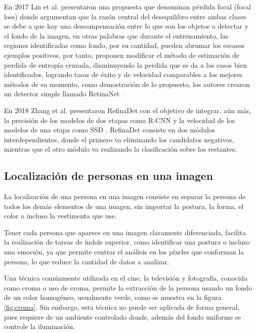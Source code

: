            En 2017 Lin et al. presentaron una propuesta que denominan pérdida focal (focal loss) \cite{Lin2017} donde argumentan que la razón central del desequilibro entre ambas clases se debe a que hay una descompensación entre lo que son los objetos a detectar y el fondo de la imagen, en otras palabras que durante el entrenamiento, las regiones identificadas como fondo, por su cantidad, pueden abrumar los escasos ejemplos positivos, por tanto, proponen modificar el método de estimación de perdida de entropía cruzada, disminuyendo la perdida que se da a los casos bien identificados, logrando tasas de éxito y de velocidad comparables a los mejores métodos de su momento, como demostración de lo propuesto, los autores crearon un detector simple llamado RetinaNet \cite{Lin2017}.
            
            En 2018 Zhang et al. presentaron RefinaDet \cite{Zhang2018} con el objetivo de  integrar, aún más, la precisión de los modelos de dos etapas como R-CNN \cite{Girshick2014} y la velocidad de los modelos de una etapa como SSD \cite{Liu2016}. RefinaDet consiste en dos módulos interdependientes, donde el primero va eliminando los candidatos negativos, mientras que el otro módulo va realizando la clasificación sobre los restantes.

    \subsection{Localización de personas en una imagen}
    \label{sub:FramePersonDetection}
        La localización de una persona en una imagen consiste en separar la persona de todos los demás elementos de una imagen, sin importar la postura, la forma, el color o incluso la vestimenta que use. 
        
        Tener cada persona que aparece en una imagen claramente diferenciada, facilita la realización de tareas de índole superior, como identificar una postura o incluso una emoción, ya que permite centrar el análisis en los píxeles que conforman la persona, lo que reduce la cantidad de datos a analizar. 
        
        Una técnica comúnmente utilizada en el cine, la televisión y fotografía, conocida como croma o uso de croma, permite la extracción de la persona usando un fondo de un color homogéneo, usualmente verde, como se muestra en la figura \ref{fig:croma}. Sin embargo, esta técnica no puede ser aplicada de forma general, pues requiere de un ambiente controlado donde, además del fondo uniforme se controle la iluminación.
        
